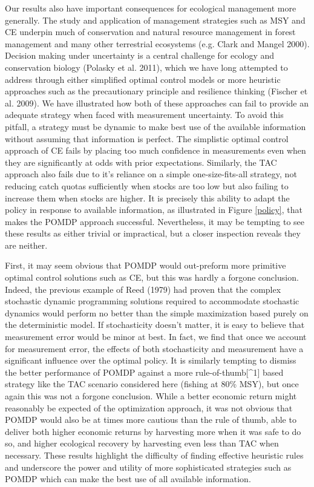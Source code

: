 \documentclass[3p]{elsarticle} %
\begin{document}
Our results also have important consequences for ecological management
more generally. The study and application of management strategies such
as MSY and CE underpin much of conservation and natural resource
management in forest management and many other terrestrial ecosystems
(e.g. Clark and Mangel 2000). Decision making under uncertainty is a
central challenge for ecology and conservation biology (Polasky et al.
2011), which we have long attempted to address through either simplified
optimal control models or more heuristic approaches such as the
precautionary principle and resilience thinking (Fischer et al. 2009).
We have illustrated how both of these approaches can fail to provide an
adequate strategy when faced with measurement uncertainty. To avoid this
pitfall, a strategy must be dynamic to make best use of the available
information without assuming that information is perfect. The
simplistic optimal control approach of CE fails by placing too much
confidence in measurements even when they are significantly at odds with
prior expectations. Similarly, the TAC approach also fails due to it's
reliance on a simple one-size-fits-all strategy, not reducing catch
quotas sufficiently when stocks are too low but also failing to increase
them when stocks are higher. It is precisely this ability to adapt the
policy in response to available information, as illustrated in Figure
\ref{policy}, that makes the POMDP approach successful. Nevertheless, it
may be tempting to see these results as either trivial or impractical,
but a closer inspection reveals they are neither.

First, it may seem obvious that POMDP would out-preform more primitive
optimal control solutions such as CE, but this was hardly a forgone
conclusion. Indeed, the previous example of Reed (1979) had proven that
the complex stochastic dynamic programming solutions required to
accommodate stochastic dynamics would perform no better than the simple
maximization based purely on the deterministic model. If stochasticity
doesn't matter, it is easy to believe that measurement error would be
minor at best. In fact, we find that once we account for measurement
error, the effects of both stochasticity and measurement have a
significant influence over the optimal policy. It is similarly tempting
to dismiss the better performance of POMDP against a more
rule-of-thumb{[}\^{}1{]} based strategy like the TAC scenario considered
here (fishing at 80\% MSY), but once again this was not a forgone
conclusion. While a better economic return might reasonably be expected
of the optimization approach, it was not obvious that POMDP would also
be at times more cautious than the rule of thumb, able to deliver both
higher economic returns by harvesting more when it was safe to do so,
and higher ecological recovery by harvesting even less than TAC when
necessary. These results highlight the difficulty of finding effective
heuristic rules and underscore the power and utility of more
sophisticated strategies such as POMDP which can make the best use of
all available information.
\end{document}
